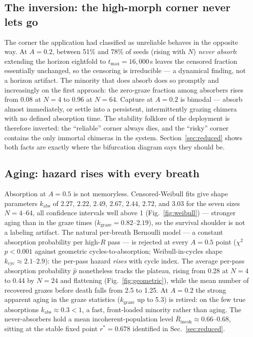 \documentclass[aip,preprint,amsmath,amssymb]{revtex4-2}
\begin{document}
\subsection{The inversion: the high-morph corner never lets go}

The corner the application had classified as unreliable behaves in the opposite way.
At $A = 0.2$, between 51\% and 78\% of seeds (rising with $N$) \emph{never absorb}:
extending the horizon eightfold to $t_{\max} = 16{,}000$\,s leaves the censored
fraction essentially unchanged, so the censoring is irreducible --- a dynamical
finding, not a horizon artifact. The minority that does absorb does so promptly and
increasingly on the first approach: the zero-graze fraction among absorbers rises
from 0.08 at $N = 4$ to 0.96 at $N = 64$. Capture at $A = 0.2$ is bimodal ---
absorb almost immediately, or settle into a persistent, intermittently grazing
chimera~\cite{sudaokuda2015} with no defined absorption time. The stability folklore of the deployment is
therefore inverted: the ``reliable'' corner always dies, and the ``risky'' corner
contains the only immortal chimeras in the system. Section~\ref{sec:reduced} shows
both facts are exactly where the bifurcation diagram says they should be.

\subsection{Aging: hazard rises with every breath}

Absorption at $A = 0.5$ is not memoryless. Censored-Weibull fits give shape
parameters $k_{\mathrm{abs}}$ of $2.27$, $2.22$, $2.49$, $2.67$, $2.44$, $2.72$, and
$3.03$ for the seven sizes $N = 4$--$64$, all confidence intervals well above 1 (Fig.~\ref{fig:weibull}) ---
stronger aging than in the graze times ($k_{\mathrm{graze}} = 0.82$--$2.19$), so the
survival shoulder is not a labeling artifact. The natural per-breath Bernoulli model
--- a constant absorption probability per high-$R$ pass --- is rejected at every
$A = 0.5$ point ($\chi^2$ $p < 0.001$ against geometric cycles-to-absorption;
Weibull-in-cycles shape $k_{\mathrm{cyc}} \approx 2.1$--$2.9$): the per-pass hazard
\emph{rises} with cycle index. The average per-pass absorption probability
$\hat p$ nonetheless tracks the plateau, rising from 0.28 at $N = 4$ to 0.44 by
$N = 24$ and flattening (Fig.~\ref{fig:geometric}), while the mean number of
recovered grazes before death falls from 2.5 to 1.25. At $A = 0.2$ the strong
apparent aging in the graze statistics ($k_{\mathrm{graze}}$ up to 5.3) is retired:
on the few true absorptions $k_{\mathrm{abs}} \approx 0.3 < 1$, a fast, front-loaded
minority rather than aging. The never-absorbers hold a mean incoherent-population
level $\overline{R}_{\mathrm{incoh}} \approx 0.66$--$0.68$, sitting at the stable
fixed point $r^* = 0.678$ identified in Sec.~\ref{sec:reduced}.
\end{document}
